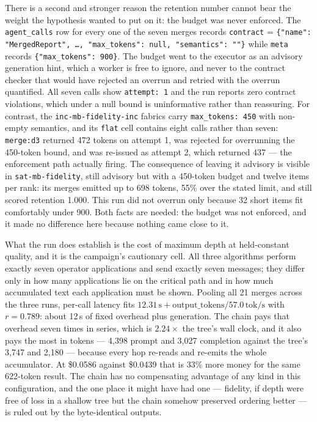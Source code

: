 \documentclass[11pt]{article}
\begin{document}
There is a second and stronger reason the retention number cannot bear the weight the
hypothesis wanted to put on it: the budget was never enforced. The \texttt{agent\_calls}
row for every one of the seven merges records \texttt{contract} =
\texttt{\{"name": "MergedReport", \dots, "max\_tokens": null, "semantics": ""\}} while
\texttt{meta} records \texttt{\{"max\_tokens": 900\}}. The budget went to the executor as
an advisory generation hint, which a worker is free to ignore, and never to the contract
checker that would have rejected an overrun and retried with the overrun quantified. All
seven calls show \texttt{attempt: 1} and the run reports zero contract violations, which
under a null bound is uninformative rather than reassuring. For contrast, the
\texttt{inc-mb-fidelity-inc} fabrics carry \texttt{max\_tokens: 450} with non-empty
semantics, and its \texttt{flat} cell contains eight calls rather than seven:
\texttt{merge:d3} returned 472 tokens on attempt 1, was rejected for overrunning the
450-token bound, and was re-issued as attempt 2, which returned 437 --- the enforcement
path actually firing. The consequence of leaving it advisory is visible in
\texttt{sat-mb-fidelity}, still advisory but with a 450-token budget and twelve items per
rank: its merges emitted up to 698 tokens, 55\% over the stated limit, and still scored
retention 1.000. This run did not overrun only because 32 short items fit comfortably
under 900. Both facts are needed: the budget was not enforced, and it made no difference
here because nothing came close to it.

What the run does establish is the cost of maximum depth at held-constant quality, and
it is the campaign's cautionary cell. All three algorithms perform exactly seven
operator applications and send exactly seven messages; they differ only in how many
applications lie on the critical path and in how much accumulated text each application
must be shown. Pooling all 21 merges across the three runs, per-call latency fits
$12.31\,\text{s} + \text{output\_tokens} / 57.0\,\text{tok/s}$ with $r = 0.789$: about
12\,s of fixed overhead plus generation. The chain pays that overhead seven times in
series, which is $2.24\times$ the tree's wall clock, and it also pays the most in tokens
--- 4{,}398 prompt and 3{,}027 completion against the tree's 3{,}747 and 2{,}180 --- 
because every hop re-reads and re-emits the whole accumulator. At \$0.0586 against
\$0.0439 that is 33\% more money for the same 622-token result. The chain has no
compensating advantage of any kind in this configuration, and the one place it might
have had one --- fidelity, if depth were free of loss in a shallow tree but the chain
somehow preserved ordering better --- is ruled out by the byte-identical outputs.
\end{document}
